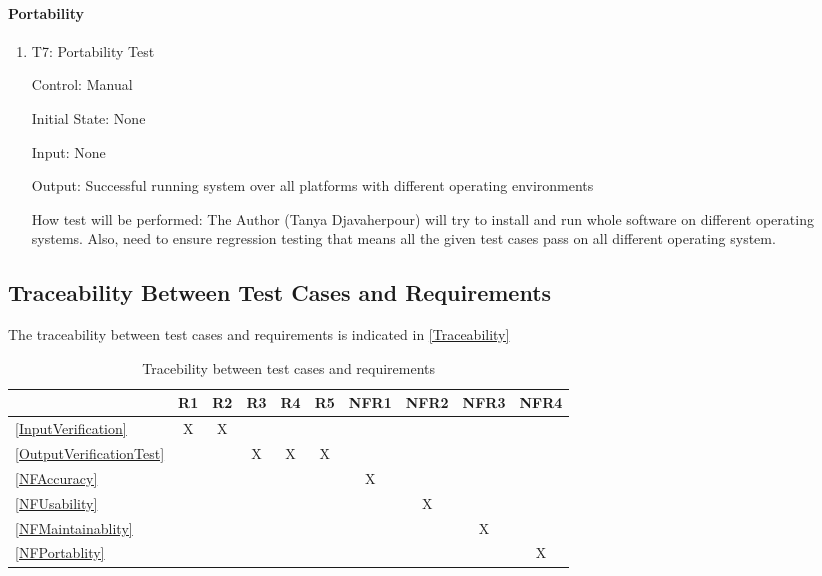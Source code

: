\documentclass[12pt, titlepage]{article}
\begin{document}
\paragraph{Portability}

\begin{enumerate}

  \item{T7: Portability Test\\}

  Control: Manual
  
  Initial State: None
  
  Input: None
  
  Output: Successful running system over all platforms with different operating environments

  How test will be performed: The Author (Tanya Djavaherpour) will try to install and run
  whole software on different operating systems. Also, need to ensure regression testing
  that means all the given test cases pass on all different operating system.
\end{enumerate}


\subsection{Traceability Between Test Cases and Requirements}

The traceability between test cases and requirements is indicated in \autoref{Traceability} 



\begin{table}[h!]
\begin{center}
\begin{tabular}{ l|c|c|c|c|c|c|c|c|c }
\hline
 & R1 & R2 & R3 & R4 & R5 & NFR1 & NFR2 & NFR3 & NFR4 \\
\hline
\ref{InputVerification} & X & X & & & & & & \\
\hline
\ref{OutputVerificationTest} & & & X & X & X & & & \\
\hline
\ref{NFAccuracy} & & & & & & X & & \\
\hline
\ref{NFUsability} & & & & & & & X & \\
\hline
\ref{NFMaintainablity} & & & & & & & & X & \\
\hline
\ref{NFPortablity} & & & & & & & & & X \\
\hline
\end{tabular}
\caption{Tracebility between test cases and requirements}
\label{Traceability}
\end{center}
\end{table}
\end{document}
